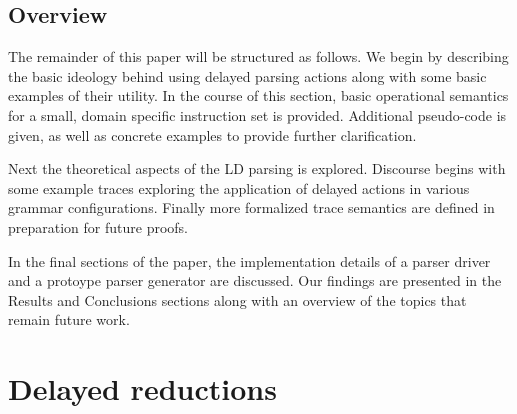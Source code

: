\documentclass[a4paper,11pt]{article}
\begin{document}


\subsection{Overview}
The remainder of this paper will be structured as follows. 
We begin by describing the basic ideology behind using delayed parsing actions along with some basic examples of their utility.
In the course of this section, basic operational semantics for a small, domain specific instruction set is provided.
Additional pseudo-code is given, as well as concrete examples to provide further clarification.

Next the theoretical aspects of the LD parsing is explored.
Discourse begins with some example traces exploring the application of delayed actions in various grammar configurations. 
Finally more formalized trace semantics are defined in preparation for future proofs.

In the final sections of the paper, the implementation details of a parser driver and a protoype parser generator are discussed.
Our findings are presented in the Results and Conclusions sections along with an overview of the topics that remain future work.

\section{Delayed reductions}
\end{document}

